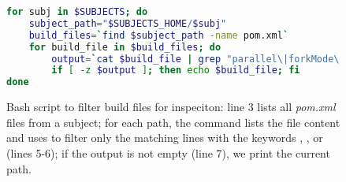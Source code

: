 \begin{figure}[h!]
\centering
\scriptsize
{}
\begin{lstlisting}[language=Bash]
for subj in $SUBJECTS; do
    subject_path="$SUBJECTS_HOME/$subj"
    build_files=`find $subject_path -name pom.xml`
    for build_file in $build_files; do
        output=`cat $build_file | grep "parallel\|forkMode\|forkCount"`
        if [ -z $output ]; then echo $build_file; fi
done
\end{lstlisting}
    \caption{\label{fig:discovery-step} Bash script to filter build
    files for inspeciton: line 3 lists all \emph{pom.xml} files from a
    subject; for each path, the   command lists the file
    content and uses  to filter only the matching lines
    with the keywords , , or
     (lines 5-6); if the output is not empty (line
    7), we print the current path.}
\end{figure}
